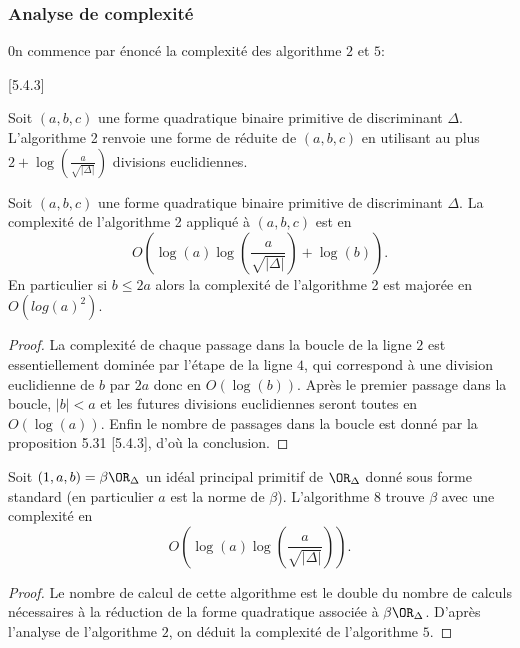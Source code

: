  
\subsubsection{Analyse de complexité}


0n commence par énoncé la complexité des algorithme $2$ et $5$:

\begin{Prop}\cite{Coh00}[5.4.3]
	
	Soit $(a,b,c)$ une forme quadratique binaire primitive de discriminant $\Delta$. L'algorithme 2 renvoie une forme de réduite de $(a,b,c)$ en utilisant au plus $2 + \log\left( \frac{a}{\sqrt{|\Delta|}} \right)$ divisions euclidiennes.
\end{Prop}

\begin{Coro}
	Soit $(a,b,c)$ une forme quadratique binaire primitive de discriminant $\Delta$. La complexité de l'algorithme 2 appliqué à $(a,b,c)$ est en 
	\begin{equation*}
		O\left( \log(a)\log\left( \frac{a}{\sqrt{|\Delta|}} \right) +\log(b)\right).
	\end{equation*}
	En particulier si $b\leq 2a$ alors la complexité de l'algorithme 2 est majorée en $O(log(a)^2)$.
	
\end{Coro}

\begin{proof}
	
	La complexité de chaque passage dans la boucle de la ligne $2$ est essentiellement dominée par l'étape de la ligne $4$, qui correspond à une division euclidienne de $b$ par $2a$ donc en $O(\log(b))$. Après le premier passage dans la boucle, $|b|<a$ et les futures divisions euclidiennes seront toutes en $O(\log(a))$. Enfin le nombre de passages dans la boucle est donné par la proposition 5.31 \cite{Coh00}[5.4.3], d'où la conclusion. 
\end{proof}

\begin{Prop}
	Soit $(1,a,b) = \beta\OR_{\Delta}$ un idéal principal primitif de $\OR_{\Delta}$ donné sous forme standard (en particulier $a$ est la norme de $\beta$). L'algorithme 8 trouve $\beta$ avec une complexité en
	\begin{equation*}
		O\left( \log(a)\log\left( \frac{a}{\sqrt{|\Delta|}} \right)\right).
	\end{equation*}
\end{Prop}

\begin{proof}
	Le nombre de calcul de cette algorithme est le double du nombre de calculs nécessaires à la réduction de la forme quadratique associée à $\beta\OR_{\Delta}$. D'après l'analyse de l'algorithme $2$, on déduit la complexité de l'algorithme $5$. 
\end{proof}

